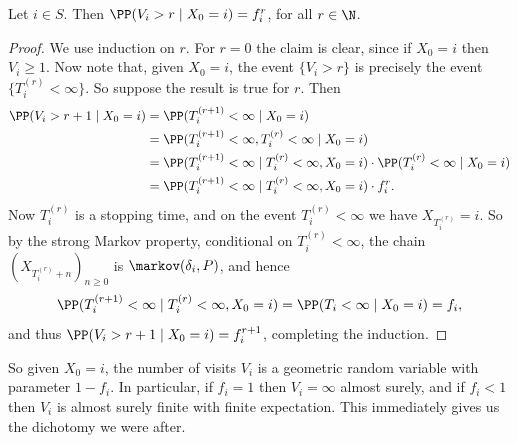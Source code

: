 \documentclass[a4paper]{scrartcl}
\begin{document}
\begin{lemma}
	Let $i \in S$. Then $\PP(V_i > r \mid X_0 = i) = f_i^r$, for all $r \in \N$.
\end{lemma}
\begin{proof}
	We use induction on $r$. For $r = 0$ the claim is clear, since if $X_0 = i$ then $V_i \geq 1$. Now note that, given $X_0 = i$, the event $\{V_i > r\}$ is precisely the event $\{T_i^{(r)} < \infty\}$. So suppose the result is true for $r$. Then
	\begin{align*}
		\PP(V_i > r + 1 \mid X_0 = i) &= \PP(T_i^{(r + 1)} < \infty \mid X_0 = i) \\
		&= \PP(T_i^{(r + 1)} < \infty, T_i^{(r)} < \infty \mid X_0 = i) \\
		&= \PP(T_i^{(r + 1)} < \infty \mid T_i^{(r)} < \infty, X_0 = i) \cdot \PP(T_i^{(r)} < \infty \mid X_0 = i) \\
		&= \PP(T_i^{(r + 1)} < \infty \mid T_i^{(r)} < \infty, X_0 = i) \cdot f_i^r.
	\end{align*}
	Now $T_i^{(r)}$ is a stopping time, and on the event $T_i^{(r)} < \infty$ we have $X_{T_i^{(r)}} = i$. So by the strong Markov property, conditional on $T_i^{(r)} < \infty$, the chain $(X_{T_i^{(r)} + n})_{n \geq 0}$ is $\markov(\delta_i, P)$, and hence
	$$
	\PP(T_i^{(r + 1)} < \infty \mid T_i^{(r)} < \infty, X_0 = i) = \PP(T_i < \infty \mid X_0 = i) = f_i,
	$$
	and thus $\PP(V_i > r + 1 \mid X_0 = i) = f_i^{r + 1}$, completing the induction.
\end{proof}

So given $X_0 = i$, the number of visits $V_i$ is a geometric random variable with parameter $1 - f_i$. In particular, if $f_i = 1$ then $V_i = \infty$ almost surely, and if $f_i < 1$ then $V_i$ is almost surely finite with finite expectation. This immediately gives us the dichotomy we were after.
\end{document}
